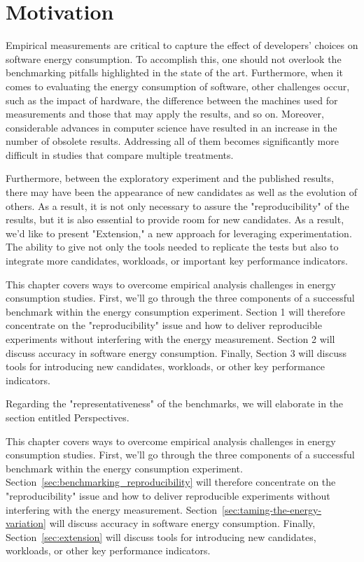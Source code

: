 
\section{Motivation}
Empirical measurements are critical to capture the effect of developers' choices on software energy consumption.
To accomplish this, one should not overlook the benchmarking pitfalls highlighted in the state of the art.
Furthermore, when it comes to evaluating the energy consumption of software, other challenges occur, such as the impact of hardware, the difference between the machines used for measurements and those that may apply the results, and so on.
Moreover, considerable advances in computer science have resulted in an increase in the number of obsolete results.
Addressing all of them becomes significantly more difficult in studies that compare multiple treatments.

Furthermore, between the exploratory experiment and the published results, there may have been the appearance of new candidates as well as the evolution of others.
As a result, it is not only necessary to assure the "reproducibility" of the results, but it is also essential to provide room for new candidates.
As a result, we'd like to present "Extension," a new approach for leveraging experimentation.
The ability to give not only the tools needed to replicate the tests but also to integrate more candidates, workloads, or important key performance indicators.



This chapter covers ways to overcome empirical analysis challenges in energy consumption studies. First, we'll go through the three components of a successful benchmark within the energy consumption experiment. Section 1 will therefore concentrate on the "reproducibility" issue and how to deliver reproducible experiments without interfering with the energy measurement. Section 2 will discuss accuracy in software energy consumption. Finally, Section 3 will discuss tools for introducing new candidates, workloads, or other key performance indicators.

Regarding the "representativeness" of the benchmarks, we will elaborate in the section entitled Perspectives.



This chapter covers ways to overcome empirical analysis challenges in energy consumption studies. First, we'll go through the three components of a successful benchmark within the energy consumption experiment. Section~\ref{sec:benchmarking_reproducibility} will therefore concentrate on the "reproducibility" issue and how to deliver reproducible experiments without interfering with the energy measurement. Section~\ref{sec:taming-the-energy-variation} will discuss accuracy in software energy consumption. Finally, Section~\ref{sec:extension} will discuss tools for introducing new candidates, workloads, or other key performance indicators.



